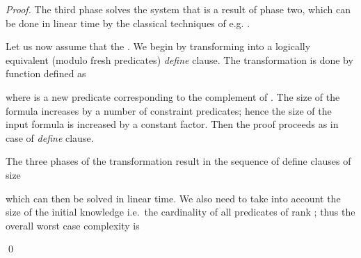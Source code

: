 \begin{proof}
The third phase solves the system that is a
  result of phase two, which can be done in linear time by the
  classical techniques of e.g. \cite{bib:hornsat}.

Let us now assume that the . We begin by
transforming  into a logically equivalent (modulo fresh
predicates) {\it define} clause. The transformation is done by
function  defined as

where  is a new predicate corresponding to the
complement of . The size of the formula increases by a number of
constraint predicates; hence the size of the input formula is increased
by a constant factor. Then the proof proceeds as in case of {\it
  define} clause.

The three phases of the transformation result in the sequence of
define clauses of size

which can then be solved in linear time. We also need to take into
account the size of the initial knowledge i.e.~the cardinality of all
predicates of rank ; thus the overall worst case complexity is

\qed
\end{proof}
